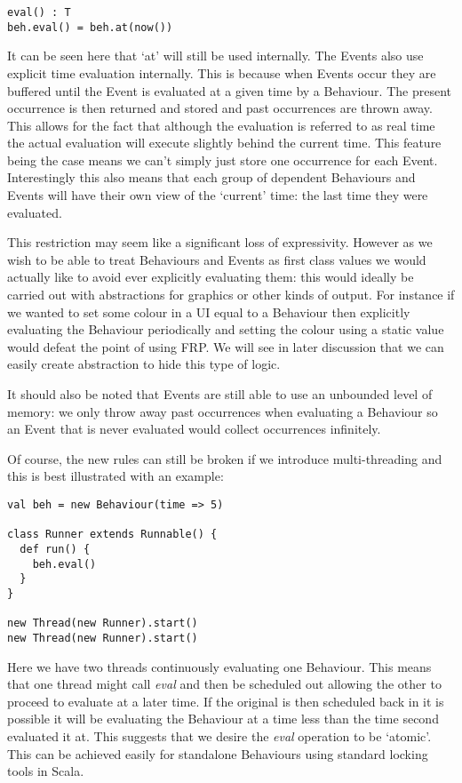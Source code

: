 \begin{verbatim}
eval() : T
beh.eval() = beh.at(now())
\end{verbatim}  

      It can be seen here that `at' will still be used internally. The Events also use explicit time
      evaluation internally. This is because when Events occur they are buffered until the Event is
      evaluated at a given time by a Behaviour. The present occurrence is then returned and stored and past occurrences
      are thrown away. This allows for the fact that although the evaluation is referred to as real time the
      actual evaluation will execute slightly behind the current time. This feature being the
      case means we can't simply just store one occurrence for each Event. Interestingly this also
      means that each group of dependent Behaviours and Events will have their own view of the `current' time:
      the last time they were evaluated.

      This restriction may seem like a significant loss of expressivity. However as we wish to be able to treat
      Behaviours and Events as first class values we would actually like to avoid ever explicitly evaluating
      them: this would ideally be carried out with abstractions for graphics or other kinds of output. For instance
      if we wanted to set some colour in a UI equal to a Behaviour then explicitly evaluating the Behaviour
      periodically and setting the colour using a static value would defeat the point of using FRP. We will see in later
      discussion that we can easily create abstraction to hide this type of logic.
      
      It should also be noted that Events are still able to use an unbounded level of memory: we only throw away
      past occurrences when evaluating a Behaviour so an Event that is never evaluated would collect occurrences
      infinitely.
      
      Of course, the new rules can still be broken if we introduce multi-threading and this is best illustrated
      with an example:
      
\begin{verbatim}
val beh = new Behaviour(time => 5)

class Runner extends Runnable() {
  def run() {
    beh.eval()
  }
}

new Thread(new Runner).start()
new Thread(new Runner).start()
\end{verbatim}       

      Here we have two threads continuously evaluating one Behaviour. This means that one thread
      might call \emph{eval} and then be scheduled out allowing the other to proceed to evaluate
      at a later time. If the original is then scheduled back in it is possible it will
      be evaluating the Behaviour at a time less than the time second evaluated it at. This suggests
      that we desire the \emph{eval} operation to be `atomic'. This can be achieved easily for standalone
      Behaviours using standard locking tools in Scala.
      
